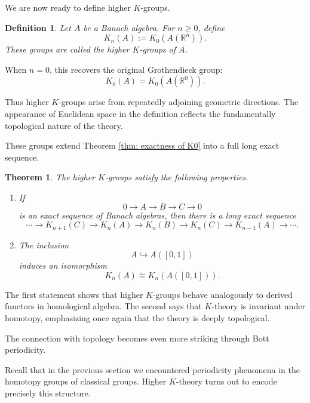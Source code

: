 \documentclass[12pt,reqno]{amsart}
\theoremstyle{plain}
\newtheorem{defn}[thm]{Definition}
\numberwithin{equation}{section}
\newtheorem{theorem}{Theorem}[section]
\begin{document}
We are now ready to define higher $K$-groups.

\begin{defn}
Let $A$ be a Banach algebra. For $n\ge 0$, define
\[
K_n(A):=K_0(A(\mathbb R^n)).
\]
These groups are called the \emph{higher $K$-groups} of $A$.
\end{defn}

When $n=0$, this recovers the original Grothendieck group:
\[
K_0(A)=K_0(A(\mathbb R^0)).
\]

Thus higher $K$-groups arise from repeatedly adjoining geometric directions. The appearance of Euclidean space in the definition reflects the fundamentally topological nature of the theory.

These groups extend Theorem \ref{thm: exactness of K0} into a full long exact sequence.

\begin{theorem}
The higher $K$-groups satisfy the following properties.
\begin{enumerate}[label=$(\arabic*)$]
    \item If
    \[
    0\longrightarrow A\longrightarrow B\longrightarrow C\longrightarrow 0
    \]
    is an exact sequence of Banach algebras, then there is a long exact sequence
    \[
    \cdots
    \to
    K_{n+1}(C)
    \to
    K_n(A)
    \to
    K_n(B)
    \to
    K_n(C)
    \to
    K_{n-1}(A)
    \to
    \cdots.
    \]

    \item The inclusion
    \[
    A\hookrightarrow A([0,1])
    \]
    induces an isomorphism
    \[
    K_n(A)\cong K_n(A([0,1])).
    \]
\end{enumerate}
\end{theorem}

The first statement shows that higher $K$-groups behave analogously to derived functors in homological algebra. The second says that $K$-theory is invariant under homotopy, emphasizing once again that the theory is deeply topological.


The connection with topology becomes even more striking through Bott periodicity.

Recall that in the previous section we encountered periodicity phenomena in the homotopy groups of classical groups. Higher $K$-theory turns out to encode precisely this structure.
\end{document}
